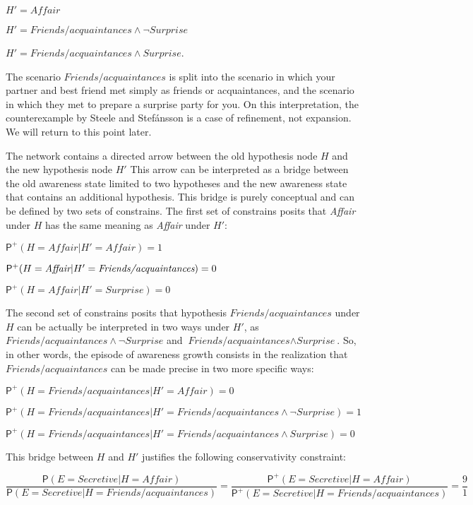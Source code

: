 \documentclass[
  11pt,
  dvipsnames,enabledeprecatedfontcommands]{scrartcl}
\newcommand{\pr}[1]{\ensuremath{\mathsf{P}(#1)}}
\newcommand{\ppr}[2]{\ensuremath{\mathsf{P}^{#1}(#2)}}
\begin{document}
\(H'=\textit{Affair}\)

\(H'=\textit{Friends/acquaintances}\wedge \neg \textit{Surprise}\)

\(H'=\textit{Friends/acquaintances}\wedge\textit{Surprise}\).

\noindent The scenario \(\textit{Friends/acquaintances}\) is split into
the scenario in which your partner and best friend met simply as friends
or acquaintances, and the scenario in which they met to prepare a
surprise party for you. On this interpretation, the counterexample by
Steele and Stefánsson is a case of refinement, not expansion. We will
return to this point later.

The network contains a directed arrow between the old hypothesis node
\(H\) and the new hypothesis node \(H'\) This arrow can be interpreted
as a bridge between the old awareness state limited to two hypotheses
and the new awareness state that contains an additional hypothesis. This
bridge is purely conceptual and can be defined by two sets of
constrains. The first set of constrains posits that \textit{Affair}
under \(H\) has the same meaning as \textit{Affair} under \(H'\):

\(\ppr{+}{H=\textit{Affair} \vert H'=\textit{Affair}}=1\)

\(\ppr{+}{H=\textit{Affair} \vert H'=\textit{\textit{Friends/acquaintances}}}=0\)

\(\ppr{+}{H=\textit{Affair} \vert H'=\textit{Surprise}}=0\)

The second set of constrains posits that hypothesis
\(\textit{Friends/acquaintances}\) under \(H\) can be actually be
interpreted in two ways under \(H'\), as
\(\textit{Friends/acquaintances} \wedge \neg \textit{Surprise}\) and
\(\textit{Friends/acquaintances} \wedge \textit{Surprise}\). So, in
other words, the episode of awareness growth consists in the realization
that \(\textit{Friends/acquaintances}\) can be made precise in two more
specific ways:

\(\ppr{+}{H=\textit{Friends/acquaintances} \vert H'=\textit{Affair}}=0\)

\(\ppr{+}{H=\textit{Friends/acquaintances} \vert H'=\textit{Friends/acquaintances} \wedge \neg \textit{Surprise}}=1\)

\(\ppr{+}{H=\textit{Friends/acquaintances} \vert H'=\textit{Friends/acquaintances} \wedge \textit{Surprise}}=0\)

This bridge between \(H\) and \(H'\) justifies the following
conservativity constraint:

\[\frac{\pr{E=\textit{Secretive}\vert H=\textit{Affair}}}{\pr{E=\textit{Secretive}\vert H=\textit{Friends/acquaintances}}} = \frac{\ppr{+}{E=\textit{Secretive}\vert H=\textit{Affair}}}{\ppr{+}{E=\textit{Secretive}\vert H=\textit{Friends/acquaintances}}}=\frac{9}{1} \]
\end{document}
